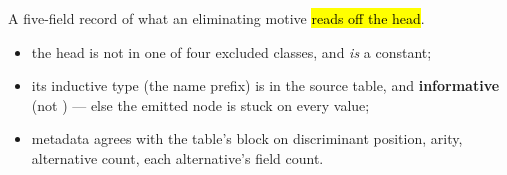\begin{definition}
\label{def:CasesHead}
\leanok
{}
 A five-field record of what an eliminating motive \hl{reads off the head}.
\begin{itemize}
\item the head is not in one of four excluded classes, and \emph{is} a  constant;
\item its inductive type (the name prefix) is in the source table, and \textbf{informative} (not
) --- else the emitted  node is stuck on every value;
\item {} metadata agrees with the table's block on discriminant position, arity, alternative
count, each alternative's field count.
\end{itemize}
\end{definition}

